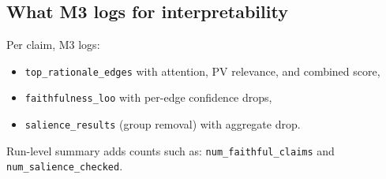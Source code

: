 \subsection{What M3 logs for interpretability}
Per claim, M3 logs:
\begin{itemize}
\item \texttt{top\_rationale\_edges} with attention, PV relevance, and combined score,
\item \texttt{faithfulness\_loo} with per-edge confidence drops,
\item \texttt{salience\_results} (group removal) with aggregate drop.
\end{itemize}
Run-level summary adds counts such as:
\texttt{num\_faithful\_claims} and \texttt{num\_salience\_checked}.
